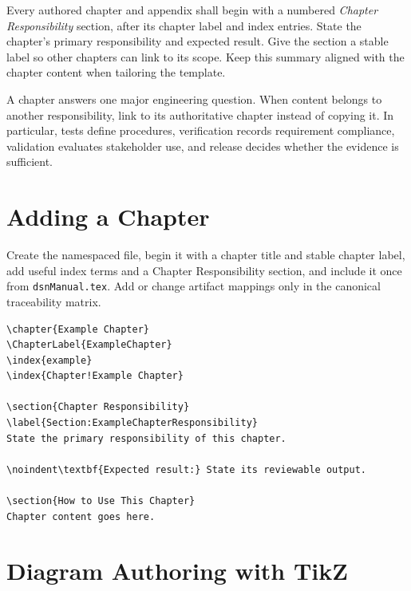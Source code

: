 Every authored chapter and appendix shall begin with a numbered
\textit{Chapter Responsibility} section, after its chapter label and index
entries. State the chapter's primary responsibility and expected result. Give
the section a stable label so other chapters can link to its scope. Keep this
summary aligned with the chapter content when tailoring the template.

A chapter answers one major engineering question. When content belongs
to another responsibility, link to its authoritative chapter instead of
copying it. In particular, tests define procedures, verification records
requirement compliance, validation evaluates stakeholder use, and release
decides whether the evidence is sufficient.

\section{Adding a Chapter}

Create the namespaced file, begin it with a chapter title and stable chapter
label, add useful index terms and a Chapter Responsibility section, and include it once from
\texttt{dsnManual.tex}. Add or change artifact mappings only in the canonical
traceability matrix.

\begin{verbatim}
\chapter{Example Chapter}
\ChapterLabel{ExampleChapter}
\index{example}
\index{Chapter!Example Chapter}

\section{Chapter Responsibility}
\label{Section:ExampleChapterResponsibility}
State the primary responsibility of this chapter.

\noindent\textbf{Expected result:} State its reviewable output.

\section{How to Use This Chapter}
Chapter content goes here.
\end{verbatim}

\section{Diagram Authoring with TikZ}
\label{Section:TikZAuthoring}

